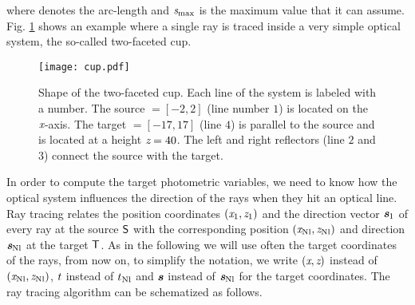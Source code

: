 where  denotes the arc-length and $\textit{s}_{\textrm{max}}$ is the maximum value that it can assume.
Fig. \ref{fig:cup} shows an example where a single ray is traced inside a very simple optical system, the so-called two-faceted cup.
\begin{figure}[h]
\label{fig:cup}
  \begin{center}
\vspace{-1.5cm}
  \texttt{[image: cup.pdf]}
  \end{center}
\vspace{-2cm}
  \caption{\footnotesize{Shape of the two-faceted cup.  Each line of the system is labeled with a number.
   The source $= [-2,2]$ (line number $1$) is located on the $\textit{x}$-axis.
   The target $= [-17, 17]$ (line $4$) is parallel to the source and is located at a height $\textit{z}= 40$.
   The left and right reflectors (line $2$ and $3$) connect the source with the target.}}
  \label{fig:cup}
\end{figure}
In order to compute the target photometric variables, we need to know how the optical system influences the direction of the rays when they hit an optical line.
Ray tracing relates the position coordinates
 $ (\textit{x}_1, \textit{z}_1)$ and the direction vector $\textit{\textbf{s}}_1$ of every ray at the source $\textsf{S}$ with the corresponding position $(\textit{x}_{\textrm{Nl}}, \textit{z}_{\textrm{Nl}})$ and direction $\textit{\textbf{s}}_{\textrm{Nl}}$
 at the target $\textsf{T}$. As in the following we will use often the target coordinates of the rays, from now on, to simplify the notation, we write $(\textit{x},\textit{z})$ instead of $(\textit{x}_{\textrm{Nl}}, \textit{z}_{\textrm{Nl}})$,  $t$ instead of $t_{\textrm{Nl}}$ and $\textit{\textbf{s}}$ instead of $\textit{\textbf{s}}_{\textrm{Nl}}$ for the target coordinates.
The ray tracing algorithm can be schematized as follows.
